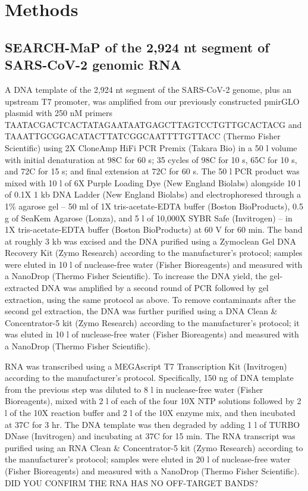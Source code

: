 \documentclass[main.tex]{subfiles}
\begin{document}
\section{Methods}
\label{methods}


\subsection{SEARCH-MaP of the 2,924 nt segment of SARS-CoV-2 genomic RNA}

A DNA template of the 2,924 nt segment of the SARS-CoV-2 genome, plus an upstream T7 promoter, was amplified from our previously constructed pmirGLO plasmid \cite{Lan2022} with 250 nM primers TAATACGACTCACTATAGAATAATGAGCTTAGTCCTGTTGCACTACG and TAAATTGCGGACATACTTATCGGCAATTTTGTTACC (Thermo Fisher Scientific) using 2X CloneAmp HiFi PCR Premix (Takara Bio) in a 50 \textmu l volume with initial denaturation at 98\textdegree C for 60 s; 35 cycles of 98\textdegree C for 10 s, 65\textdegree C for 10 s, and 72\textdegree C for 15 s; and final extension at 72\textdegree C for 60 s.
The 50 \textmu l PCR product was mixed with 10 \textmu l of 6X Purple Loading Dye (New England Biolabs) alongside 10 \textmu l of 0.1X 1 kb DNA Ladder (New England Biolabs) and electrophoresed through a 1\% agarose gel -- 50 ml of 1X tris-acetate-EDTA buffer (Boston BioProducts), 0.5 g of SeaKem Agarose (Lonza), and 5 \textmu l of 10,000X SYBR Safe (Invitrogen) -- in 1X tris-acetate-EDTA buffer (Boston BioProducts) at 60 V for 60 min.
The band at roughly 3 kb was excised and the DNA purified using a Zymoclean Gel DNA Recovery Kit (Zymo Research) according to the manufacturer's protocol; samples were eluted in 10 \textmu l of nuclease-free water (Fisher Bioreagents) and measured with a NanoDrop (Thermo Fisher Scientific).
To increase the DNA yield, the gel-extracted DNA was amplified by a second round of PCR followed by gel extraction, using the same protocol as above.
To remove contaminants after the second gel extraction, the DNA was further purified using a DNA Clean \& Concentrator-5 kit (Zymo Research) according to the manufacturer's protocol; it was eluted in 10 \textmu l of nuclease-free water (Fisher Bioreagents) and measured with a NanoDrop (Thermo Fisher Scientific).

RNA was transcribed using a MEGAscript T7 Transcription Kit (Invitrogen) according to the manufacturer's protocol.
Specifically, 150 ng of DNA template from the previous step was diluted to 8 \textmu l in nuclease-free water (Fisher Bioreagents), mixed with 2 \textmu l of each of the four 10X NTP solutions followed by 2 \textmu l of the 10X reaction buffer and 2 \textmu l of the 10X enzyme mix, and then incubated at 37\textdegree C for 3 hr.
The DNA template was then degraded by adding 1 \textmu l of TURBO DNase (Invitrogen) and incubating at 37\textdegree C for 15 min.
The RNA transcript was purified using an RNA Clean \& Concentrator-5 kit (Zymo Research) according to the manufacturer's protocol; samples were eluted in 20 \textmu l of nuclease-free water (Fisher Bioreagents) and measured with a NanoDrop (Thermo Fisher Scientific).
DID YOU CONFIRM THE RNA HAS NO OFF-TARGET BANDS?
\end{document}
